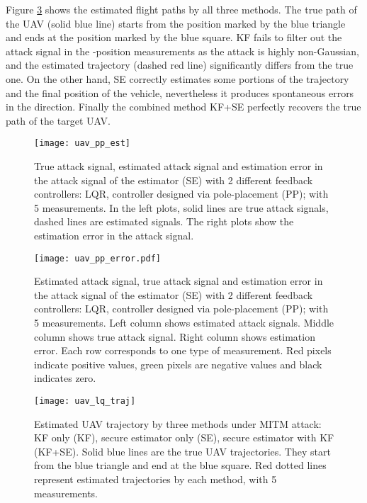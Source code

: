 \documentclass[journal]{IEEEtran}
\begin{document}
Figure \ref{fig:ex_uav_remote} shows the estimated flight paths by all three methods.
The true path of the UAV (solid blue line) starts from the position marked by the blue triangle and ends at the position marked by the blue square. KF fails to filter out the attack signal in the -position measurements as the attack is highly non-Gaussian, and the estimated trajectory (dashed red line) significantly differs from the true one. On the other hand, SE correctly estimates some portions of the trajectory and the final position of the vehicle, nevertheless it produces spontaneous errors in the  direction. 
Finally the combined method KF+SE perfectly recovers the true path of the target UAV.


\begin{figure}
\center
\texttt{[image: uav\_pp\_est]}
\caption{True attack signal, estimated attack signal and estimation error in the attack signal of the estimator (SE) with 2 different feedback controllers: LQR, controller designed via pole-placement (PP); with 5 measurements. In the left plots, solid lines are true attack signals, dashed lines are estimated signals. The right plots show the estimation error in the attack signal.}
\label{fig:ex_pp_est}
\end{figure}


\begin{figure}
\center
\texttt{[image: uav\_pp\_error.pdf]}
\caption{Estimated attack signal, true attack signal and estimation error in the attack signal of the estimator (SE) with 2 different feedback controllers: LQR, controller designed via pole-placement (PP); with 5 measurements. Left column shows estimated attack signals. Middle column shows true attack signal. Right column shows estimation error. Each row corresponds to one type of measurement. Red pixels indicate positive values, green pixels are negative values and black indicates zero. }
\label{fig:ex_pp_err}
\end{figure}


\begin{figure}
\center
\texttt{[image: uav\_lq\_traj]}
\caption{Estimated UAV trajectory by three methods under MITM attack: KF only (KF), secure estimator only (SE), secure estimator with KF (KF+SE). Solid blue lines are the true UAV trajectories. They start from the blue triangle and end at the blue square. Red dotted lines represent estimated trajectories by each method, with 5 measurements.}
\label{fig:ex_uav_remote}
\end{figure}
\end{document}
